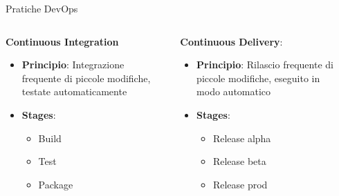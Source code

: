 \begin{frame}{Pratiche DevOps}
    \begin{columns}[onlytextwidth,t]
        \begin{column}{0.33\textwidth}
    
            \textbf{Continuous Integration}
            \vspace{2mm}
            \begin{itemize}
                \item \textbf{Principio}: Integrazione frequente di piccole modifiche, testate automaticamente
                \vspace{2mm}
                \item \textbf{Stages}:
                \begin{itemize}
                    \item Build
                    \item Test
                    \item Package
                \end{itemize}
            \end{itemize}
            
        \end{column}
        \begin{column}{0.33\textwidth}

            \textbf{Continuous Delivery}:
            \vspace{2mm}
            \begin{itemize}
                \item \textbf{Principio}: Rilascio frequente di piccole modifiche, eseguito in modo automatico \newline
                \vspace{2mm}
                \item \textbf{Stages}:
                \begin{itemize}
                    \item Release alpha
                    \item Release beta
                    \item Release prod
                \end{itemize}
            \end{itemize}
        
        \end{column}
        \begin{column}{0.33\textwidth}


\end{column}
\end{columns}
\end{frame}
